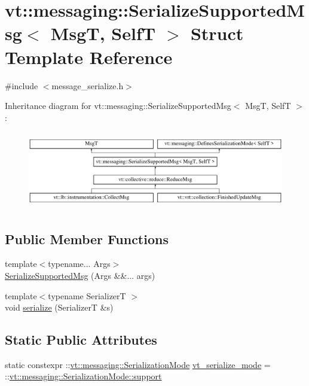\hypertarget{structvt_1_1messaging_1_1_serialize_supported_msg}{}\section{vt\+:\+:messaging\+:\+:Serialize\+Supported\+Msg$<$ MsgT, SelfT $>$ Struct Template Reference}
\label{structvt_1_1messaging_1_1_serialize_supported_msg}


{\ttfamily \#include $<$message\+\_\+serialize.\+h$>$}

Inheritance diagram for vt\+:\+:messaging\+:\+:Serialize\+Supported\+Msg$<$ MsgT, SelfT $>$\+:\begin{figure}[H]
\begin{center}
\leavevmode
\includegraphics[height=3.446154cm]{structvt_1_1messaging_1_1_serialize_supported_msg}
\end{center}
\end{figure}
\subsection*{Public Member Functions}
\begin{DoxyCompactItemize}
\item 
{\footnotesize template$<$typename... Args$>$ }\\\hyperlink{structvt_1_1messaging_1_1_serialize_supported_msg_a38a364cb0fdfb2822d4b65dcba7d05ef}{Serialize\+Supported\+Msg} (Args \&\&... args)
\item 
{\footnotesize template$<$typename SerializerT $>$ }\\void \hyperlink{structvt_1_1messaging_1_1_serialize_supported_msg_a361827e8eb53fbd212b8f702485ff297}{serialize} (SerializerT \&s)
\end{DoxyCompactItemize}
\subsection*{Static Public Attributes}
\begin{DoxyCompactItemize}
\item 
static constexpr \+::\hyperlink{namespacevt_1_1messaging_a436c5b9fc7f591e5978a136999cb9ef8}{vt\+::messaging\+::\+Serialization\+Mode} \hyperlink{structvt_1_1messaging_1_1_serialize_supported_msg_a4bc4c6e7b2b6201ce8fc47babc34d799}{vt\+\_\+serialize\+\_\+mode} = \+::\hyperlink{namespacevt_1_1messaging_a436c5b9fc7f591e5978a136999cb9ef8a434990c8a25d2be94863561ae98bd682}{vt\+::messaging\+::\+Serialization\+Mode\+::support}
\end{DoxyCompactItemize}


